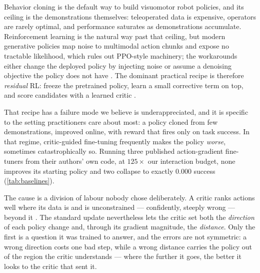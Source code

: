 Behavior cloning is the default way to build visuomotor robot policies, and
its ceiling is the demonstrations themselves: teleoperated data is expensive,
operators are rarely optimal, and performance saturates as demonstrations
accumulate. Reinforcement learning is the natural way past that ceiling, but
modern generative policies map noise to multimodal action chunks and expose
no tractable likelihood, which rules out PPO-style machinery; the workarounds
either change the deployed policy by injecting noise \citep{reinflow2025} or
assume a denoising objective the policy does not have
\citep{mcallister2025flowmatchingpolicygradients}. The dominant practical
recipe is therefore \emph{residual} RL: freeze the pretrained policy, learn a
small corrective term on top, and score candidates with a learned critic
\citep{dicerl2026}.

That recipe has a failure mode we believe is underappreciated, and it is
specific to the setting practitioners care about most: a policy cloned from few
demonstrations, improved online, with reward that fires only on task success.
In that regime, critic-guided fine-tuning frequently makes the policy
\emph{worse}, sometimes catastrophically so. Running three published
action-gradient fine-tuners from their authors' own code, at $125\times$ our
interaction budget, none improves its starting policy and two collapse to
exactly $0.000$ success (\cref{tab:baselines}).

The cause is a division of labour nobody chose deliberately. A critic ranks
actions well where its data is and is unconstrained --- confidently, steeply
wrong --- beyond it \citep{fujimoto2018td3,fujimoto2019bcq,savo2025}. The
standard update nevertheless lets the critic set both the \emph{direction} of
each policy change and, through its gradient magnitude, the \emph{distance}.
Only the first is a question it was trained to answer, and the errors are not
symmetric: a wrong direction costs one bad step, while a wrong distance
carries the policy out of the region the critic understands --- where the
further it goes, the better it looks to the critic that sent it.

